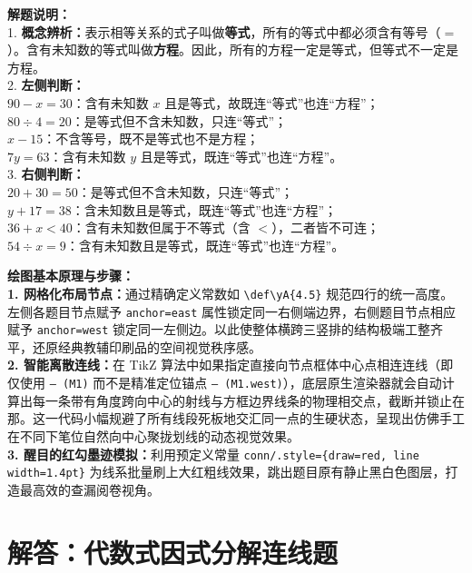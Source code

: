 \vspace{0.6cm}

{\small\color{gray}
\textbf{解题说明：}\\
1. \textbf{概念辨析：}表示相等关系的式子叫做\textbf{等式}，所有的等式中都必须含有等号（$=$）。含有未知数的等式叫做\textbf{方程}。因此，所有的方程一定是等式，但等式不一定是方程。\\
2. \textbf{左侧判断：}\\
\quad $90-x=30$：含有未知数 $x$ 且是等式，故既连“等式”也连“方程”；\\
\quad $80\div4=20$：是等式但不含未知数，只连“等式”；\\
\quad $x-15$：不含等号，既不是等式也不是方程；\\
\quad $7y=63$：含有未知数 $y$ 且是等式，既连“等式”也连“方程”。\\
3. \textbf{右侧判断：}\\
\quad $20+30=50$：是等式但不含未知数，只连“等式”；\\
\quad $y+17=38$：含未知数且是等式，既连“等式”也连“方程”；\\
\quad $36+x<40$：含有未知数但属于不等式（含 $<$），二者皆不可连；\\
\quad $54\div x=9$：含有未知数且是等式，既连“等式”也连“方程”。
}

\vspace{0.6cm}

{\small\color{blue!70!black}
\textbf{绘图基本原理与步骤：}\\
\textbf{1. 网格化布局节点：}通过精确定义常数如 \texttt{\textbackslash def\textbackslash yA\{4.5\}} 规范四行的统一高度。左侧各题目节点赋予 \texttt{anchor=east} 属性锁定同一右侧端边界，右侧题目节点相应赋予 \texttt{anchor=west} 锁定同一左侧边。以此使整体横跨三竖排的结构极端工整齐平，还原经典教辅印刷品的空间视觉秩序感。\\
\textbf{2. 智能离散连线：}在 TikZ 算法中如果指定直接向节点框体中心点相连连线（即仅使用 \texttt{-- (M1)} 而不是精准定位锚点 \texttt{-- (M1.west)}），底层原生渲染器就会自动计算出每一条带有角度跨向中心的射线与方框边界线条的物理相交点，截断并锁止在那。这一代码小幅规避了所有线段死板地交汇同一点的生硬状态，呈现出仿佛手工在不同下笔位自然向中心聚拢划线的动态视觉效果。\\
\textbf{3. 醒目的红勾墨迹模拟：}利用预定义常量 \texttt{conn/.style=\{draw=red, line width=1.4pt\}} 为线系批量刷上大红粗线效果，跳出题目原有静止黑白色图层，打造最高效的查漏阅卷视角。
}



\section{解答：代数式因式分解连线题}


